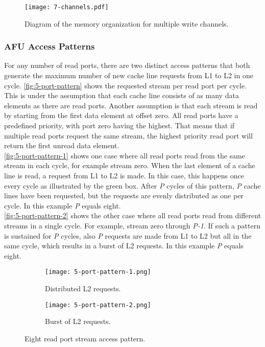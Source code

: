 \begin{figure}[h]
  \centering
  \texttt{[image: 7-channels.pdf]}
  \caption{Diagram of the memory organization for multiple write channels.}
  \label{fig:7-channels}
\end{figure}



\subsubsection{AFU Access Patterns}
For any number of read ports, there are two distinct access patterns that both generate the maximum number of new cache line requests from L1 to L2 in one cycle. \autoref{fig:5-port-pattern} shows the requested stream per read port per cycle. This is under the assumption that each cache line consists of as many data elements as there are read ports. Another assumption is that each stream is read by starting from the first data element at offset zero. All read ports have a predefined priority, with port zero having the highest. That means that if multiple read ports request the same stream, the highest priority read port will return the first unread data element.\\
\autoref{fig:5-port-pattern-1} shows one case where all read ports read from the same stream in each cycle, for example stream zero. When the last element of a cache line is read, a request from L1 to L2 is made. In this case, this happens once every cycle as illustrated by the green box. After \textit{P} cycles of this pattern, \textit{P} cache lines have been requested, but the requests are evenly distributed as one per cycle. In this example \textit{P} equals eight.\\
\autoref{fig:5-port-pattern-2} shows the other case where all read ports read from different streams in a single cycle. For example, stream zero through \textit{P-1}. If such a pattern is sustained for \textit{P} cycles, also \textit{P} requests are made from L1 to L2 but all in the same cycle, which results in a burst of L2 requests. In this example \textit{P} equals eight.

\begin{figure}[h]
  \centering
  \begin{subfigure}[c]{.5\textwidth}
    \centering
    \texttt{[image: 5-port-pattern-1.png]}
    \caption{Distributed L2 requests.}
    \label{fig:5-port-pattern-1}
  \end{subfigure}%
  \begin{subfigure}[c]{.5\textwidth}
    \centering
    \texttt{[image: 5-port-pattern-2.png]}
    \caption{Burst of L2 requests.}
    \label{fig:5-port-pattern-2}
  \end{subfigure}
  \caption{Eight read port stream access pattern.}
  \label{fig:5-port-pattern}
\end{figure}

